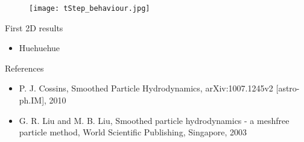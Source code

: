 \documentclass{beamer}
\begin{document}
\begin{figure}[!ht]
\begin{center}
\texttt{[image: tStep\_behaviour.jpg]} 

\end{center}
\end{figure}


\begin{frame}{First 2D results}
\begin{itemize}

\item Huehuehue

\end{itemize}
\end{frame}

\begin{frame}{References}
\begin{itemize}

\item P. J. Cossins, Smoothed Particle Hydrodynamics, arXiv:1007.1245v2 [astro-ph.IM], 2010 

\item G. R. Liu and M. B. Liu, Smoothed particle hydrodynamics - a meshfree particle method, World Scientific Publishing, Singapore, 2003

\end{itemize}
\end{frame}
\end{document}
